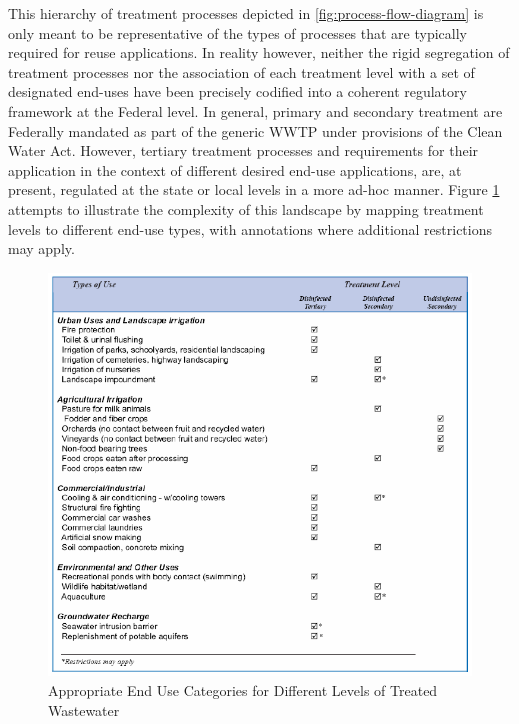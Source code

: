 This hierarchy of treatment processes depicted in \ref{fig:process-flow-diagram} is only meant to be representative of the types of processes that are typically required for reuse applications. In reality however, neither the rigid segregation of treatment processes nor the association of each treatment level with a set of designated end-uses have been precisely codified into a coherent regulatory framework at the Federal level. In general, primary and secondary treatment are Federally mandated as part of the generic WWTP under provisions of the Clean Water Act. However, tertiary treatment processes and requirements for their application in the context of different desired end-use applications, are, at present, regulated at the state or local levels in a more ad-hoc manner. Figure \ref{fig:use-categories} attempts to illustrate the complexity of this landscape by mapping treatment levels to different end-use types, with annotations where additional restrictions may apply.

     \begin{figure}[!h]
       \centering
       \includegraphics[width=5.5in]{figures/use-categories.png}
       \caption[Appropriate End Use Categories for Different Levels of Treated Wastewater]{Appropriate End Use Categories for Different Levels of Treated Wastewater}
       \label{fig:use-categories}
     \end{figure}
     
